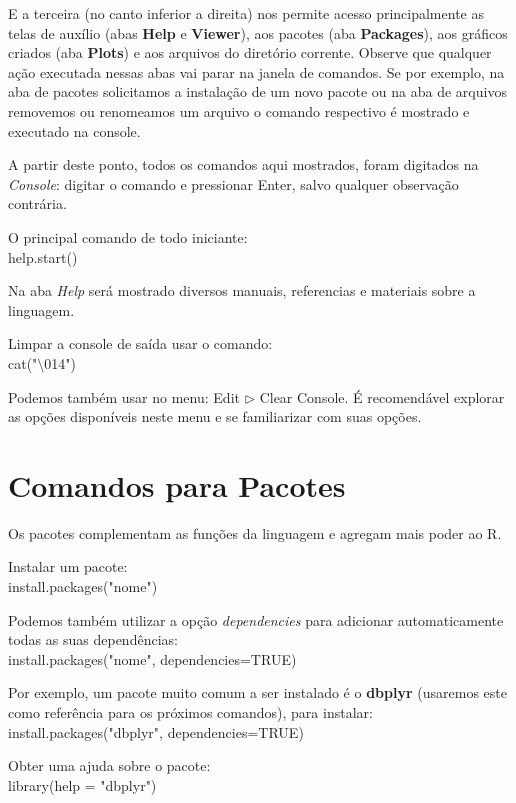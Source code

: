 \documentclass[a4paper,11pt]{article}
\begin{document}
E a terceira (no canto inferior a direita) nos permite acesso principalmente as telas de auxílio (abas \textbf{Help} e \textbf{Viewer}), aos pacotes (aba \textbf{Packages}), aos gráficos criados (aba \textbf{Plots}) e aos arquivos do diretório corrente. Observe que qualquer ação executada nessas abas vai parar na janela de comandos. Se por exemplo, na aba de pacotes solicitamos a instalação de um novo pacote ou na aba de arquivos removemos ou renomeamos um arquivo o comando respectivo é mostrado e executado na console.

\begin{theo}[]{}
A partir deste ponto, todos os comandos aqui mostrados, foram digitados na \textit{Console}: digitar o comando e pressionar Enter, salvo qualquer observação contrária. 
\end{theo}

O principal comando de todo iniciante: \\
{\ttfamily help.start()} 

Na aba \textit{Help} será mostrado diversos manuais, referencias e materiais sobre a linguagem.

Limpar a console de saída usar o comando: \\
{\ttfamily cat("$\setminus$014")}

Podemos também usar no menu: Edit $\triangleright$ Clear Console. É recomendável explorar as opções disponíveis neste menu e se familiarizar com suas opções.

\section{Comandos para Pacotes}
Os pacotes complementam as funções da linguagem e agregam mais poder ao R. 

Instalar um pacote: \\
{\ttfamily install.packages("nome")}

Podemos também utilizar a opção \textit{dependencies} para adicionar automaticamente todas as suas dependências: \\
{\ttfamily install.packages("nome", dependencies=TRUE)}

Por exemplo, um pacote muito comum a ser instalado é o \textbf{dbplyr} (usaremos este como referência para os próximos comandos), para instalar: \\
{\ttfamily install.packages("dbplyr", dependencies=TRUE)}

Obter uma ajuda sobre o pacote: \\
{\ttfamily library(help = "dbplyr")}
\end{document}
